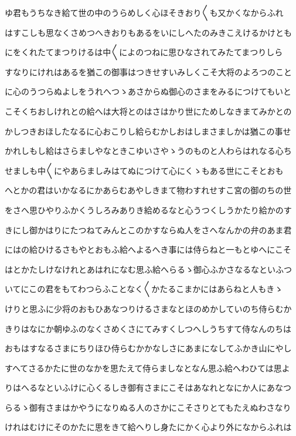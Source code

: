 \documentclass[a4paper,11pt,landscape]{ltjtarticle}
\begin{document}
ゆ君もうちなき給て世の中のうらめしく心ほそきおり〱も又かくなからふれ
\par\medskip
はすこしも思なくさめつへきおりもあるをいにしへたのみきこえけるかけとも
\par\medskip
にをくれたてまつりけるは中〱によのつねに思ひなされてみたてまつりしら
\par\medskip
すなりにけれはあるを猶この御事はつきせすいみしくこそ大将のよろつのこと
\par\medskip
に心のうつらぬよしをうれへつゝあさからぬ御心のさまをみるにつけてもいと
\par\medskip
こそくちおしけれとの給へは大将とのはさはかり世にためしなきまてみかとの
\par\medskip
かしつきおほしたなるに心おこりし給らむかしおはしまさましかは猶この事せ
\par\medskip
かれしもし給はさらましやなときこゆいさやゝうのものと人わらはれなる心ち
\par\medskip
せましも中〱にやあらましみはてぬにつけて心にくゝもある世にこそとおも
\par\medskip
へとかの君はいかなるにかあらむあやしきまて物わすれせすこ宮の御のちの世
\par\medskip
をさへ思ひやりふかくうしろみありき給めるなと心うつくしうかたり給かのす
\par\medskip
きにし御かはりにたつねてみんとこのかすならぬ人をさへなんかの弁のあま君
\par\medskip
にはの給ひけるさもやとおもふ給へよるへき事には侍らねと一もとゆへにこそ
\par\medskip
はとかたしけなけれとあはれになむ思ふ給へらるゝ御心ふかさなるなといふつ
\par\medskip
いてにこの君をもてわつらふことなく〱かたるこまかにはあらねと人もきゝ
\par\medskip
けりと思ふに少将のおもひあなつりけるさまなとほのめかしていのち侍らむか
\par\medskip
きりはなにか朝ゆふのなくさめくさにてみすくしつへしうちすて侍なんのちは
\par\medskip
おもはすなるさまにちりほひ侍らむかかなしさにあまになしてふかき山にやし
\par\medskip
すへてさるかたに世のなかを思たえて侍らましなとなん思ふ給へわひては思よ
\par\medskip
りはへるなといふけに心くるしき御有さまにこそはあなれとなにか人にあなつ
\par\medskip
らるゝ御有さまはかやうになりぬる人のさかにこそさりとてもたえぬわさなり
\par\medskip
けれはむけにそのかたに思をきて給へりし身たにかく心より外になからふれは
\end{document}
